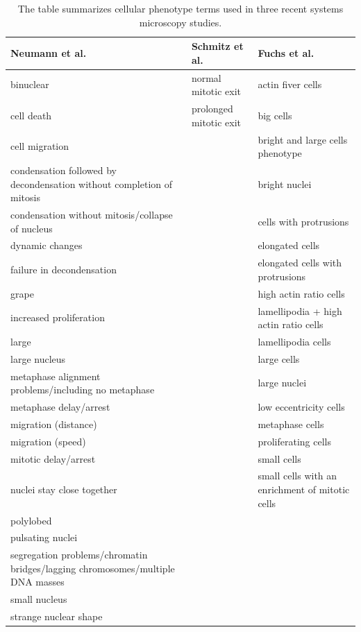 \documentclass{bioinfo}
\renewcommand{\cite}{\citep}
\begin{document}
\begin{table}
  \centering
  \begin{tabular}{|p{7cm}|l|p{4cm}|}
    Neumann et al.\cite{Neumann2010}&Schmitz et
    al.\cite{Schmitz2010}&Fuchs et al.\cite{Fuchs2010}\\
    \hline
    binuclear & normal mitotic exit & actin fiver cells\\
    cell death & prolonged mitotic exit & big cells \\
    cell migration & & bright and large cells phenotype \\
    condensation followed by decondensation without completion of
    mitosis & & bright nuclei\\
    condensation without mitosis/collapse of nucleus & & cells with protrusions\\
    dynamic changes & & elongated cells\\
    failure in decondensation & & elongated cells with protrusions\\
    grape& & high actin ratio cells \\
    increased proliferation& & lamellipodia + high actin ratio cells\\
    large& & lamellipodia cells\\
    large nucleus& & large cells\\
    metaphase alignment problems/including no metaphase& & large nuclei\\
    metaphase delay/arrest& & low eccentricity cells\\
    migration (distance)& & metaphase cells\\
    migration (speed)& & proliferating cells\\
    mitotic delay/arrest& & small cells\\
    nuclei stay close together& & small cells with an enrichment of mitotic cells\\
    polylobed& &\\
    pulsating nuclei& &\\
    segregation problems/chromatin bridges/lagging chromosomes/multiple DNA masses&&\\
    small nucleus&&\\
    strange nuclear shape&&\\
    \hline
  \end{tabular}
  \caption{\label{tbl:studies}The table summarizes cellular phenotype
    terms used in three recent systems microscopy studies.}
\end{table}
\end{document}
